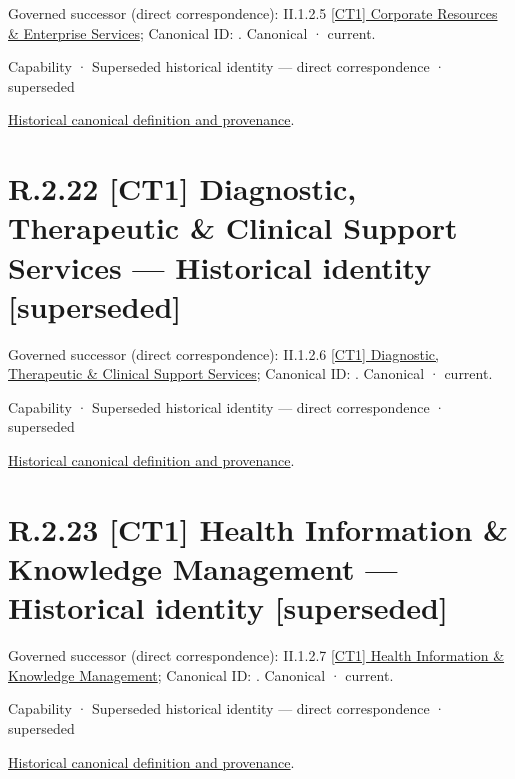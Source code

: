 {\small Governed successor (direct correspondence): II.1.2.5 \hyperref[element:b79628f156e14a8cbb82a0dea2fc57ff]{[CT1] Corporate Resources \& Enterprise Services}; Canonical ID: \texttt{}. Canonical · current.}\par
\label{element:a2dbd74847a44f4c879983229f5c9d08}
{\small Capability · Superseded historical identity — direct correspondence · superseded}\par
\href{../../../../../../../continuum/strategy/capability/a2dbd74847a44f4c879983229f5c9d08.md}{Historical canonical definition and provenance}.\par
\section*{R.2.22 [CT1] Diagnostic, Therapeutic \& Clinical Support Services — Historical identity [superseded]}
\label{navigation:R.2.22}

{\small Governed successor (direct correspondence): II.1.2.6 \hyperref[element:4d98c3503a9f4890a677f09b0c3b6f82]{[CT1] Diagnostic, Therapeutic \& Clinical Support Services}; Canonical ID: \texttt{}. Canonical · current.}\par
\label{element:e003b9cd0730459a84775d2837d1d173}
{\small Capability · Superseded historical identity — direct correspondence · superseded}\par
\href{../../../../../../../continuum/strategy/capability/e003b9cd0730459a84775d2837d1d173.md}{Historical canonical definition and provenance}.\par
\section*{R.2.23 [CT1] Health Information \& Knowledge Management — Historical identity [superseded]}
\label{navigation:R.2.23}

{\small Governed successor (direct correspondence): II.1.2.7 \hyperref[element:cca5d5abec204b339eb5b9bd924ed64e]{[CT1] Health Information \& Knowledge Management}; Canonical ID: \texttt{}. Canonical · current.}\par
\label{element:a1c557bd263047d0b3ff566cf50b98c1}
{\small Capability · Superseded historical identity — direct correspondence · superseded}\par
\href{../../../../../../../continuum/strategy/capability/a1c557bd263047d0b3ff566cf50b98c1.md}{Historical canonical definition and provenance}.\par
